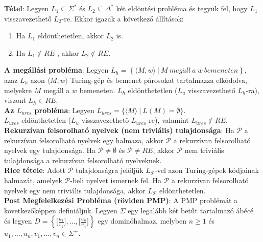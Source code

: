 \documentclass[tikz,12pt,margin=0px]{article}
\newcommand\ddfrac[2]{\frac{\displaystyle #1}{\displaystyle #2}}
\begin{document}
    \noindent \textbf{Tétel}: Legyen $L_{1} \subseteq \Sigma^{*}$ és $L_{2} \subseteq \Delta^{*}$ két eldöntési probléma és tegyük fel, hogy $L_{1}$ visszavezethető $L_{2}$-re. Ekkor igazak a következő állítások:
	
	\begin{enumerate}
		\item Ha $L_{1}$ eldönthetetlen, akkor $L_{2}$ is.
		\item Ha $L_{1} \notin RE$ , akkor $L_{2} \notin RE$.
	\end{enumerate}
	
    \noindent \textbf{A megállási probléma}: Legyen $L_{h} = \left\{\langle M, w \rangle \ |\ M \ meg\acute{a}ll \ a \ w \ bemeneten \right\}$, azaz $L_{h}$ azon $\langle M, w \rangle$ Turing-gép és bemenet párosokat tartalmazza elkódolva, melyekre $M$ megáll a $w$ bemeneten. $L_{h}$ eldönthetetlen ($L_{u}$ visszavezethető $L_{h}$-ra), viszont $L_{h} \in RE$.\\
	
	\noindent \textbf{Az $L_{\ddot{u}res}$ probléma}: Legyen $L_{\ddot{u}res} = \Big\{\langle M \rangle \ |\ L(M) = \emptyset \Big\}$.\\
	$L_{\ddot{u}res}$ eldönthetetlen ($L_{u}$ visszavezethető $L_{\ddot{u}res}$-re), valamint $L_{\ddot{u}res} \notin RE$.\\
	
	\noindent \textbf{Rekurzívan felsorolható nyelvek (nem triviális) tulajdonsága}: Ha $\mathcal{P}$ a rekurzívan felsorolható
	nyelvek egy halmaza, akkor $\mathcal{P}$ a rekurzívan felsorolható nyelvek egy tulajdonsága. Ha $\mathcal{P} \not = \emptyset$ és
	$\mathcal{P} \not = RE$, akkor $\mathcal{P}$ nem triviális tulajdonsága a rekurzívan felsorolható nyelveknek.\\
	
	\noindent \textbf{Rice tétele}:
	Adott $\mathcal{P}$ tulajdonságra jelöljük $L_{\mathcal{P}}$-vel azon Turing-gépek kódjainak halmazát, amelyek
	$\mathcal{P}$-beli nyelvet ismernek fel. Ha $\mathcal{P}$ a rekurzívan felsorolható nyelvek egy nem triviális tulajdonsága, akkor
	$L_{\mathcal{P}}$ eldönthetetlen.\\

	\noindent \textbf{Post Megfelelkezési Probléma (röviden PMP)}: A PMP problémát a következőképpen definiáljuk. Legyen
	$\Sigma$ egy legalább két betűt tartalmazó ábécé és legyen $D = \left\{\Big[\ddfrac{u_{1}}{v_{1}}\Big], \ldots, \Big[\ddfrac{u_{n}}{v_{n}}\Big]\right\}$
	egy dominóhalmaz, melyben $n \geq 1$ és $u_{1}, \ldots, u_{n}, v_{1}, \ldots, v_{n} \in \Sigma^{+}$.\\
\end{document}

